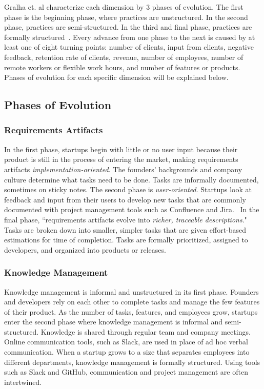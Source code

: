 \documentclass{sig-alternate}
\begin{document}
Gralha et. al characterize each dimension by 3 phases of evolution. The first phase is the beginning phase, where practices are unstructured. In the second phase, practices are semi-structured. In the third and final phase, practices are formally structured~\cite{Gralha:2018}. Every advance from one phase to the next is caused by at least one of eight turning points: number of clients, input from clients, negative feedback, retention rate of clients, revenue, number of employees, number of remote workers or flexible work hours, and number of features or products.~\cite{Gralha:2018} Phases of evolution for each specific dimension will be explained below.

\subsection{Phases of Evolution}
\label{sec:reqPracticeEvolution}

\subsubsection{Requirements Artifacts}
In the first phase, startups begin with little or no user input because their product is still in the process of entering the market, making requirements artifacts \emph{implementation-oriented}. The founders' backgrounds and company culture determine what tasks need to be done. Tasks are informally documented, sometimes on sticky notes. The second phase is \emph{user-oriented}. Startups look at feedback and input from their users to develop new tasks that are commonly documented with project management tools such as Confluence and Jira.~\cite{Gralha:2018} In the final phase, ``requirements artifacts evolve into \emph{richer, traceable descriptions}."~\cite{Gralha:2018} Tasks are broken down into smaller, simpler tasks that are given effort-based estimations for time of completion. Tasks are formally prioritized, assigned to developers, and organized into products or releases.

\subsubsection{Knowledge Management}
Knowledge management is informal and unstructured in its first phase. Founders and developers rely on each other to complete tasks and manage the few features of their product. As the number of tasks, features, and employees grow, startups enter the second phase where knowledge management is informal and semi-structured. Knowledge is shared through regular team and company meetings. Online communication tools, such as Slack, are used in place of ad hoc verbal communication. When a startup grows to a size that separates employees into different departments, knowledge management is formally structured. Using tools such as Slack and GitHub, communication and project management are often intertwined.
\end{document}

